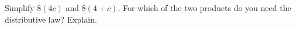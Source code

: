 Simplify $8(4c)$ and $8(4+c)$. For which of the two products do you need the distributive law? Explain.
